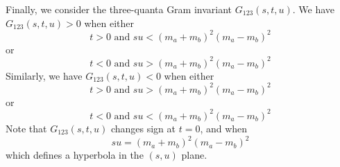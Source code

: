 Finally, we consider the three-quanta Gram invariant $G_{123}(s, t, u)$. We have $G_{123}(s, t, u) > 0$ when either
\begin{equation}
	t > 0 \text{ and } s u < (m_{a} + m_{b})^{2} (m_{a} - m_{b})^{2}
\end{equation}
or
\begin{equation}
	t < 0 \text{ and } s u > (m_{a} + m_{b})^{2} (m_{a} - m_{b})^{2}
\end{equation}
Similarly, we have $G_{123}(s, t, u) < 0$ when either
\begin{equation}
	t > 0 \text{ and } s u > (m_{a} + m_{b})^{2} (m_{a} - m_{b})^{2}
\end{equation}
or
\begin{equation}
	t < 0 \text{ and } s u < (m_{a} + m_{b})^{2} (m_{a} - m_{b})^{2}
\end{equation}
Note that $G_{123}(s, t, u)$ changes sign at $t = 0$, and when
\begin{equation}
	su = (m_{a} + m_{b})^{2} (m_{a} - m_{b})^{2}
\end{equation}
which defines a hyperbola in the $(s, u)$ plane.
